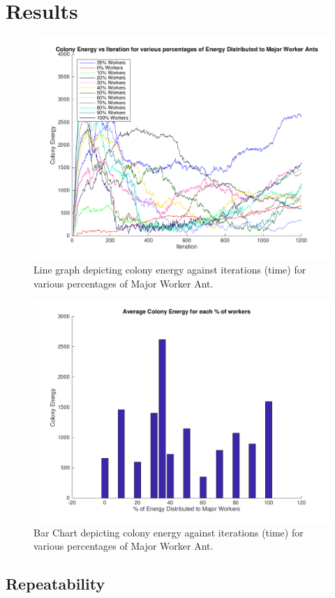 \section{Results}


\begin{figure}[H]
  \centering
  \includegraphics[width=1\textwidth]{images/line-graph-results.png}
  \caption{Line graph depicting colony energy against iterations (time) for various percentages of Major Worker Ant.}
  \label{fig:iters-line}
\end{figure}

\begin{figure}[H]
  \centering
  \includegraphics[width=1\textwidth]{images/bar-chart-results.png}
  \caption{Bar Chart depicting colony energy against iterations (time) for various percentages of Major Worker Ant.}
  \label{fig:iters-bar}
\end{figure}


\subsection{Repeatability}
